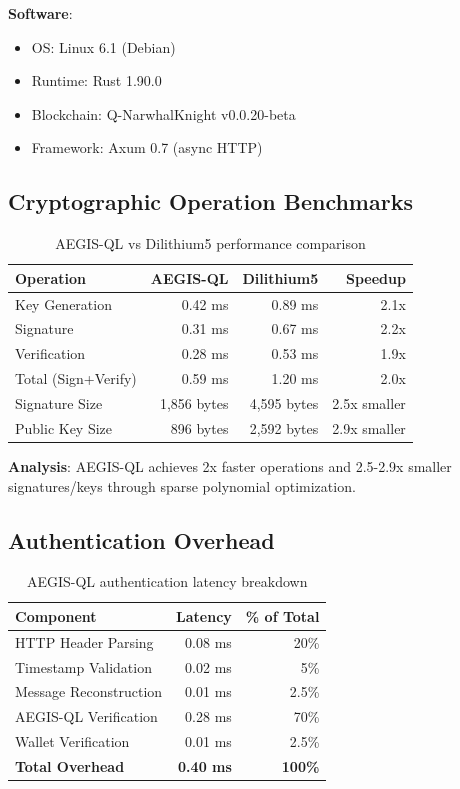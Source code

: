 \documentclass[11pt,a4paper]{article}
\begin{document}
\textbf{Software}:
\begin{itemize}[leftmargin=*]
    \item OS: Linux 6.1 (Debian)
    \item Runtime: Rust 1.90.0
    \item Blockchain: Q-NarwhalKnight v0.0.20-beta
    \item Framework: Axum 0.7 (async HTTP)
\end{itemize}

\subsection{Cryptographic Operation Benchmarks}

\begin{table}[h]
\centering
\begin{tabular}{@{}lrrr@{}}
\toprule
\textbf{Operation} & \textbf{AEGIS-QL} & \textbf{Dilithium5} & \textbf{Speedup} \\ \midrule
Key Generation & 0.42 ms & 0.89 ms & 2.1x \\
Signature & 0.31 ms & 0.67 ms & 2.2x \\
Verification & 0.28 ms & 0.53 ms & 1.9x \\
Total (Sign+Verify) & 0.59 ms & 1.20 ms & 2.0x \\ \midrule
Signature Size & 1,856 bytes & 4,595 bytes & 2.5x smaller \\
Public Key Size & 896 bytes & 2,592 bytes & 2.9x smaller \\ \bottomrule
\end{tabular}
\caption{AEGIS-QL vs Dilithium5 performance comparison}
\label{tab:crypto_bench}
\end{table}

\textbf{Analysis}: AEGIS-QL achieves 2x faster operations and 2.5-2.9x smaller signatures/keys through sparse polynomial optimization.

\subsection{Authentication Overhead}

\begin{table}[h]
\centering
\begin{tabular}{@{}lrr@{}}
\toprule
\textbf{Component} & \textbf{Latency} & \textbf{\% of Total} \\ \midrule
HTTP Header Parsing & 0.08 ms & 20\% \\
Timestamp Validation & 0.02 ms & 5\% \\
Message Reconstruction & 0.01 ms & 2.5\% \\
AEGIS-QL Verification & 0.28 ms & 70\% \\
Wallet Verification & 0.01 ms & 2.5\% \\ \midrule
\textbf{Total Overhead} & \textbf{0.40 ms} & \textbf{100\%} \\ \bottomrule
\end{tabular}
\caption{AEGIS-QL authentication latency breakdown}
\label{tab:auth_latency}
\end{table}
\end{document}
